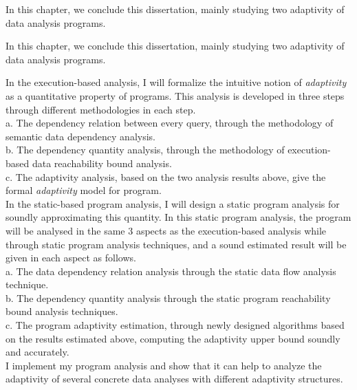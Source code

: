 In this chapter, we conclude this dissertation, mainly studying two adaptivity of data analysis programs.

In this chapter, we conclude this dissertation, mainly studying two adaptivity of data analysis programs.


In the execution-based analysis, I will formalize the intuitive notion of \emph{adaptivity} as a quantitative 
   property of programs. This analysis is developed in three steps through different methodologies in each step. 
   \\
	a. The dependency relation between every query, through the methodology of semantic data dependency analysis.
   \\
	b. The dependency quantity analysis, through the methodology of execution-based data reachability bound analysis.
   \\
	c. The adaptivity analysis, based on the two analysis results above, give the formal \emph{adaptivity} model 
   for program.
   \\   
	In the static-based program analysis, I will design a static program analysis for soundly approximating this quantity.
   In this static program analysis, the program will be analysed in the same 3 aspects as the execution-based analysis 
   while through static program analysis techniques, and a sound estimated result will be given in each aspect as follows.
   \\
	a. The data dependency relation analysis through the static data flow analysis technique.
   \\
	b. The dependency quantity analysis through the static program reachability bound analysis techniques.
   \\
	c. The program adaptivity estimation, through newly designed algorithms based on the results estimated above, 
   computing the adaptivity upper bound soundly 
   and accurately.
   \\
I implement my program analysis and show that it can help to analyze the adaptivity of several concrete data analyses with different adaptivity structures.

